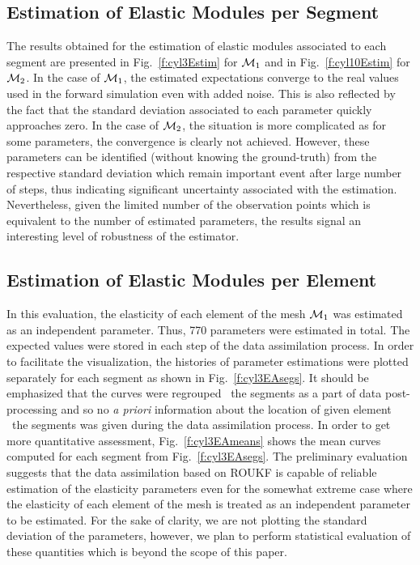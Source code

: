 \subsection{Estimation of Elastic Modules per Segment}
\label{sr:segment}
The results obtained for the estimation of elastic modules associated to each segment are presented in Fig.~\ref{f:cyl3Estim} for 
$\mathcal{M}_1$ and in Fig.~\ref{f:cyl10Estim} for $\mathcal{M}_2$. In the case of $\mathcal{M}_1$, the estimated expectations converge to the real values 
used in the forward simulation even with added noise. This is also reflected by the fact that the standard deviation associated to each 
parameter quickly approaches zero. In the case of $\mathcal{M}_2$, the situation is more complicated as for some parameters, the convergence is clearly 
not achieved. However, these parameters can be identified (without knowing the ground-truth) from the respective standard deviation which 
remain important event after large number of steps, thus indicating significant uncertainty associated with the estimation. 
Nevertheless, given the limited number of the observation points which is equivalent to the number of estimated parameters, 
the results signal an interesting level of robustness of the estimator. 

\subsection{Estimation of Elastic Modules per Element}
\label{sr:element}
In this evaluation, the elasticity of each element of the mesh $\mathcal{M}_1$ was estimated as an independent parameter. Thus, 770 parameters were estimated in total. 
The expected values were stored in each step of the data assimilation process. In order to facilitate the visualization, 
the histories of parameter estimations were plotted separately for each segment as shown in Fig.~\ref{f:cyl3EAsegs}. 
It should be emphasized that the curves were regrouped \wrt\ the segments as a part of data post-processing and so no \emph{a priori} 
information about the location of given element \wrt\ the segments was given during the data assimilation process. 
In order to get more quantitative assessment, Fig.~\ref{f:cyl3EAmeans} shows the mean curves computed for each segment 
from Fig.~\ref{f:cyl3EAsegs}. The preliminary evaluation suggests that the data assimilation based on ROUKF is capable of 
reliable estimation of the elasticity parameters even for the somewhat extreme case where the elasticity of each element of the 
mesh is treated as an independent parameter to be estimated. For the sake of clarity, we are not plotting the standard deviation
of the parameters, however, we plan to perform statistical evaluation of these quantities which is beyond the scope of this paper. 

